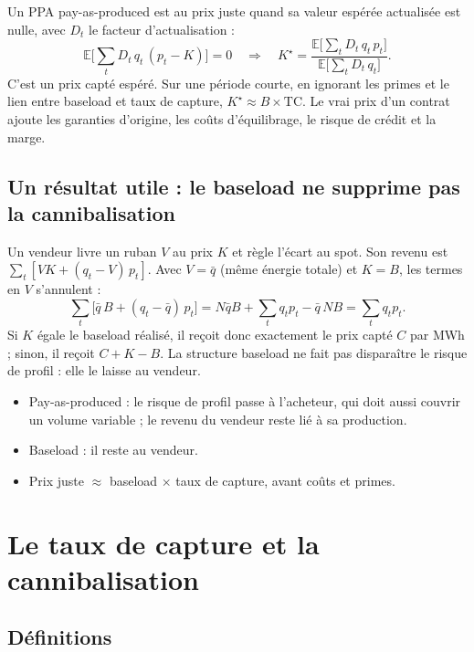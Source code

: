 \documentclass[11pt,a4paper]{article}
\newcommand{\TC}{\mathrm{TC}}
\begin{document}
Un PPA pay-as-produced est au prix juste quand sa valeur espérée actualisée est nulle, avec $D_t$ le facteur d'actualisation :
\[
\mathbb{E}\Big[\sum_t D_t\, q_t\,(p_t - K)\Big] = 0
\quad\Longrightarrow\quad
K^\star = \frac{\mathbb{E}\big[\sum_t D_t\, q_t\, p_t\big]}{\mathbb{E}\big[\sum_t D_t\, q_t\big]} .
\]
C'est un prix capté espéré. Sur une période courte, en ignorant les primes et le lien entre baseload et taux de capture, $K^\star \approx B \times \TC$. Le vrai
prix d'un contrat ajoute les garanties d'origine, les coûts d'équilibrage, le risque de crédit et la marge.

\subsection{Un résultat utile : le baseload ne supprime pas la cannibalisation}

Un vendeur livre un ruban $V$ au prix $K$ et règle l'écart au spot. Son revenu est
$\sum_t [V K + (q_t - V)\,p_t]$. Avec $V = \bar q$ (même énergie totale) et $K = B$, les termes en $V$ s'annulent :
\[
\sum_t \big[\bar q\, B + (q_t - \bar q)\,p_t\big] = N\bar q B + \sum_t q_t p_t - \bar q\, N B = \sum_t q_t p_t .
\]
Si $K$ égale le baseload réalisé, il reçoit donc exactement le prix capté $C$ par MWh ; sinon, il reçoit $C + K - B$. La structure baseload ne fait pas disparaître le risque de
profil : elle le laisse au vendeur.

\begin{aretenir}
\begin{itemize}[leftmargin=*]
\item Pay-as-produced : le risque de profil passe à l'acheteur, qui doit aussi couvrir un volume variable ; le revenu du vendeur reste lié à sa production.
\item Baseload : il reste au vendeur.
\item Prix juste $\approx$ baseload $\times$ taux de capture, avant coûts et primes.
\end{itemize}
\end{aretenir}

\section{Le taux de capture et la cannibalisation}

\subsection{Définitions}
\end{document}

